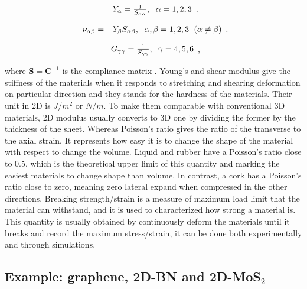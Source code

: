\begin{equation}
\begin{array}{c}

Y_\alpha=\frac{1}{S_{\alpha\alpha}},\hspace{6 pt} \alpha = 1, 2, 3
\end{array}.
\end{equation}

\begin{equation}
\begin{array}{c}
\nu_{\alpha\beta}=-Y_\beta S_{\alpha\beta},\hspace{6 pt} \alpha, \beta = 1, 2, 3 
\hspace{6 pt}(\alpha\neq\beta)
\end{array}.
\end{equation}

\begin{equation}
\begin{array}{c}
G_{\gamma\gamma}=\frac{1}{S_{\gamma\gamma}} ,\hspace{6 pt} \gamma = 4, 5, 6
\end{array},
\end{equation}

where $\boldsymbol{S}=\boldsymbol{C}^{-1}$ is the compliance matrix \citep[e.g.][]{nye1985physical}. Young's and shear modulus give the stiffness of the materials when it responds to stretching and shearing deformation on particular direction and they stands for the hardness of the materials. Their unit in 2D is $J/m^2$ or $N/m$. To make them comparable with conventional 3D materials, 2D modulus usually converts to 3D one by dividing the former by the thickness of the sheet. Whereas Poisson's ratio gives the ratio of the transverse to the axial strain. It represents how easy it is to change the shape of the material with respect to change the volume. Liquid and rubber have a Poisson's ratio close to 0.5, which is the theoretical upper limit of this quantity and marking the easiest materials to change shape than volume. In contrast, a cork has a Poisson's ratio close to zero, meaning zero lateral expand when compressed in the other directions. Breaking strength/strain is a measure of maximum load limit that the material can withstand, and it is used to characterized how strong a material is. This quantity is usually obtained by continuously deform the materials until it breaks and record the maximum stress/strain, it can be done both experimentally and through simulations. 

\subsection{Example: graphene, 2D-BN and 2D-MoS$_2$}


